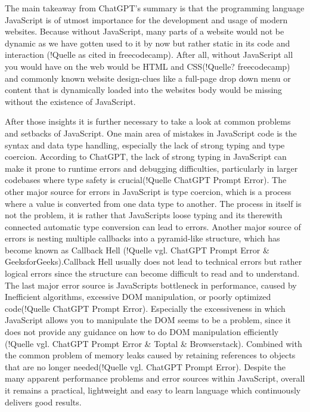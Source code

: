 The main takeaway from ChatGPT's summary is that the programming language JavaScript is of utmost importance for the development and usage of modern websites. Because without JavaScript, many parts of a website would not be dynamic as we have gotten used to it by now but rather static in its code and interaction (!Quelle as cited in freecodecamp). After all, without JavaScript \dq all you would have on the web would be HTML and CSS\dq (!Quelle? freecodecamp) and commonly known website design-clues like a full-page drop down menu or content that is dynamically loaded into the websites body would be missing without the existence of JavaScript.

After those insights it is further necessary to take a look at common problems and setbacks of JavaScript. One main area of mistakes in JavaScript code is the syntax and data type handling, especially the lack of strong typing and type coercion. According to ChatGPT, the lack of strong typing in JavaScript \dq can make it prone to runtime errors and debugging difficulties, particularly in larger codebases where type safety is crucial\dq (!Quelle ChatGPT Prompt Error). The other major source for errors in JavaScript is type coercion, which is a process where a value is converted from one data type to another. The process in itself is not the problem, it is rather that JavaScripts loose typing and its therewith connected automatic type conversion can lead to errors.
Another major source of errors is nesting multiple callbacks into a pyramid-like structure, which has become known as Callback Hell (!Quelle vgl. ChatGPT Prompt Error \& GeeksforGeeks).Callback Hell usually does not lead to technical errors but rather logical errors since the structure can become difficult to read and to understand. 
The last major error source is JavaScripts bottleneck in performance, caused by \dq Inefficient algorithms, excessive DOM manipulation, or poorly optimized code\dq (!Quelle ChatGPT Prompt Error). Especially the excessiveness in which JavaScript allows you to manipulate the DOM seems to be a problem, since it does not provide any guidance on how to do DOM manipulation efficiently (!Quelle vgl. ChatGPT Prompt Error \& Toptal \& Browserstack). Combined with the common problem of memory leaks caused by \dq retaining references to objects that are no longer needed\dq (!Quelle vgl. ChatGPT Prompt Error).
Despite the many apparent performance problems and error sources within JavaScript, overall it remains a practical, lightweight and easy to learn language which continuously delivers good results.